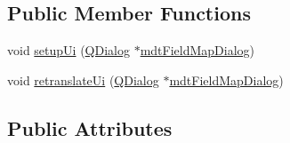 \subsection*{Public Member Functions}
\begin{DoxyCompactItemize}
\item 
void \hyperlink{class_ui__mdt_field_map_dialog_a7d58994b0e701889b8fbf84f44118def}{setup\-Ui} (\hyperlink{class_q_dialog}{Q\-Dialog} $\ast$\hyperlink{classmdt_field_map_dialog}{mdt\-Field\-Map\-Dialog})
\item 
void \hyperlink{class_ui__mdt_field_map_dialog_a9d423cec8b0ff24420f926495eb1f4ad}{retranslate\-Ui} (\hyperlink{class_q_dialog}{Q\-Dialog} $\ast$\hyperlink{classmdt_field_map_dialog}{mdt\-Field\-Map\-Dialog})
\end{DoxyCompactItemize}
\subsection*{Public Attributes}
